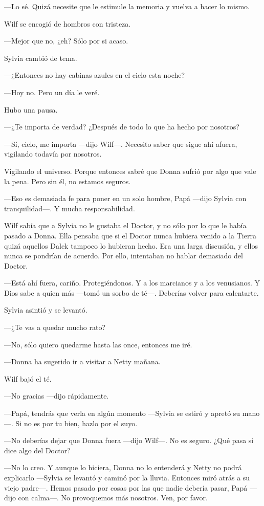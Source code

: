 ---Lo sé. Quizá necesite que le estimule la memoria y vuelva a hacer lo
mismo.

Wilf se encogió de hombros con tristeza.

---Mejor que no, ¿eh? Sólo por si acaso.

Sylvia cambió de tema.

---¿Entonces no hay cabinas azules en el cielo esta noche?

---Hoy no. Pero un día le veré.

Hubo una pausa.

---¿Te importa de verdad? ¿Después de todo lo que ha hecho por
nosotros?

---Sí, cielo, me importa ---dijo Wilf---. Necesito saber que sigue ahí
afuera, vigilando todavía por nosotros.

Vigilando el universo. Porque entonces sabré que Donna sufrió por algo
que vale la pena. Pero sin él, no estamos seguros.

---Eso es demasiada fe para poner en un solo hombre, Papá ---dijo Sylvia
con tranquilidad---. Y mucha responsabilidad.

Wilf sabía que a Sylvia no le gustaba el Doctor, y no sólo por lo que le
había pasado a Donna. Ella pensaba que si el Doctor nunca hubiera venido
a la Tierra quizá aquellos Dalek tampoco lo hubieran hecho. Era una
larga discusión, y ellos nunca se pondrían de acuerdo. Por ello,
intentaban no hablar demasiado del Doctor.

---Está ahí fuera, cariño. Protegiéndonos. Y a los marcianos y a los
venusianos. Y Dios sabe a quien más ---tomó un sorbo de té---. Deberías
volver para calentarte.

Sylvia asintió y se levantó.

---¿Te vas a quedar mucho rato?

---No, sólo quiero quedarme hasta las once, entonces me iré.

---Donna ha sugerido ir a visitar a Netty mañana.

Wilf bajó el té.

---No gracias ---dijo rápidamente.

---Papá, tendrás que verla en algún momento ---Sylvia se estiró y apretó
su mano---. Si no es por tu bien, hazlo por el suyo.

---No deberías dejar que Donna fuera ---dijo Wilf---. No es seguro. ¿Qué
pasa si dice algo del Doctor?

---No lo creo. Y aunque lo hiciera, Donna no lo entenderá y Netty no
podrá explicarlo ---Sylvia se levantó y caminó por la lluvia. Entonces
miró atrás a su viejo padre---. Hemos pasado por cosas por las que nadie
debería pasar, Papá ---dijo con calma---. No provoquemos más nosotros.
Ven, por favor.


